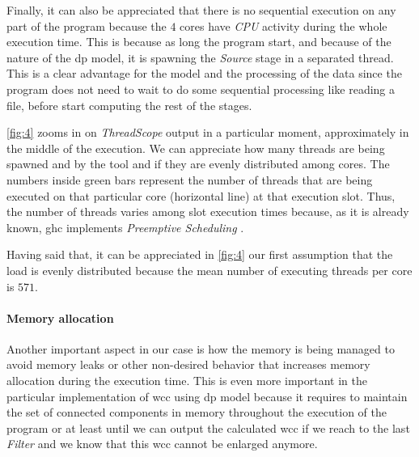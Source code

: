 Finally, it can also be appreciated that there is no sequential execution on any part of the program because the $4$ cores have \textit{CPU} activity during the whole execution time. This is because as long the program start, and because of the nature of the \acrshort{dp} model, it is spawning the \textit{Source} stage in a separated thread. This is a clear advantage for the model and the processing of the data since the program does not need to wait to do some sequential processing like reading a file, before start computing the rest of the stages.





\autoref{fig:4} zooms in on \textit{ThreadScope} output in a particular moment, approximately in the middle of the execution. We can appreciate how many threads are being spawned and by the tool and if they are evenly distributed among cores. The numbers inside green bars represent the number of threads that are being executed on that particular core (horizontal line) at that execution slot. Thus, the number of threads varies among slot execution times because, as it is already known, \acrshort{ghc} implements \emph{Preemptive Scheduling} \cite{lightweightghc}.

Having said that, it can be appreciated in \autoref{fig:4} our first assumption that the load is evenly distributed because the mean number of executing threads per core is $571$.

\paragraph{Memory allocation} Another important aspect in our case is how the memory is being managed to avoid memory leaks or other non-desired behavior that increases memory allocation during the execution time. This is even more important in the particular implementation of \acrshort{wcc} using \acrshort{dp} model because it requires to maintain the set of connected components in memory throughout the execution of the program or at least until we can output the calculated \acrshort{wcc} if we reach to the last \textit{Filter} and we know that this \acrshort{wcc} cannot be enlarged anymore. 

